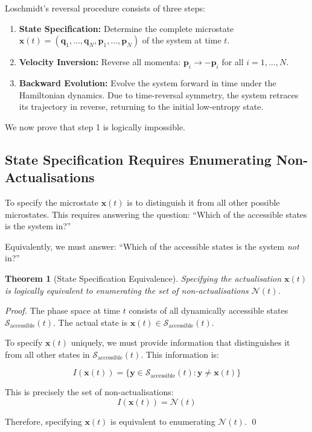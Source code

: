 \documentclass[twocolumn,10pt]{article}
\newtheorem{theorem}{Theorem}[section]
\theoremstyle{definition}
\theoremstyle{remark}
\begin{document}
Loschmidt's reversal procedure consists of three steps:

\begin{enumerate}
\item \textbf{State Specification:} Determine the complete microstate $\mathbf{x}(t) = (\mathbf{q}_1, \ldots, \mathbf{q}_N, \mathbf{p}_1, \ldots, \mathbf{p}_N)$ of the system at time $t$.

\item \textbf{Velocity Inversion:} Reverse all momenta: $\mathbf{p}_i \to -\mathbf{p}_i$ for all $i = 1, \ldots, N$.

\item \textbf{Backward Evolution:} Evolve the system forward in time under the Hamiltonian dynamics. Due to time-reversal symmetry, the system retraces its trajectory in reverse, returning to the initial low-entropy state.
\end{enumerate}

We now prove that step 1 is logically impossible.

\subsection{State Specification Requires Enumerating Non-Actualisations}

To specify the microstate $\mathbf{x}(t)$ is to distinguish it from all other possible microstates. This requires answering the question: ``Which of the accessible states is the system in?''

Equivalently, we must answer: ``Which of the accessible states is the system \textit{not} in?''

\begin{theorem}[State Specification Equivalence]
Specifying the actualisation $\mathbf{x}(t)$ is logically equivalent to enumerating the set of non-actualisations $\mathcal{N}(t)$.
\end{theorem}

\begin{proof}
The phase space at time $t$ consists of all dynamically accessible states $\mathcal{S}_{\text{accessible}}(t)$. The actual state is $\mathbf{x}(t) \in \mathcal{S}_{\text{accessible}}(t)$.

To specify $\mathbf{x}(t)$ uniquely, we must provide information that distinguishes it from all other states in $\mathcal{S}_{\text{accessible}}(t)$. This information is:

$$
I(\mathbf{x}(t)) = \{\mathbf{y} \in \mathcal{S}_{\text{accessible}}(t) : \mathbf{y} \neq \mathbf{x}(t)\}
$$

This is precisely the set of non-actualisations:
$$
I(\mathbf{x}(t)) = \mathcal{N}(t)
$$

Therefore, specifying $\mathbf{x}(t)$ is equivalent to enumerating $\mathcal{N}(t)$. \qed
\end{proof}
\end{document}
